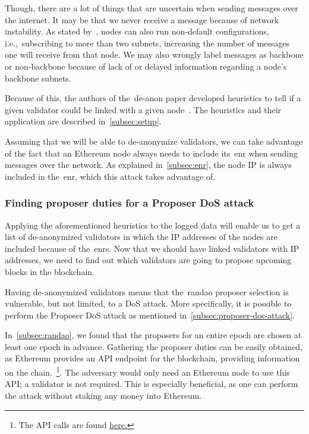 Though, there are a lot of things that are uncertain when sending messages over the internet.
It may be that we never receive a message because of network instability.
As stated by~\cite{heimbach2024deanonymizingethereumvalidatorsp2p}, nodes can also run non-default configurations,
i.e.,\ subscribing to more than two subnets, increasing the number of messages one will receive from that node.
We may also wrongly label messages as backbone or non-backbone because of lack of or delayed information regarding a node's backbone subnets.

Because of this,
the authors of the~\gls{de-anon paper} developed heuristics to tell if a given validator could be linked with a given node~\cite{heimbach2024deanonymizingethereumvalidatorsp2p}.
The heuristics and their application are described in~\autoref{subsec:setup}.

Assuming that we will be able to de-anonymize validators, we can take advantage of the fact that an Ethereum node always needs to include its~\gls{enr} when sending messages over the network.
As explained in~\autoref{subsec:enr}, the node IP is always included in the~\gls{enr}, which this attack takes advantage of.

\subsubsection{Finding proposer duties for a Proposer DoS attack}
Applying the aforementioned heuristics to the logged data will enable us to get a list of de-anonymized validators in which the IP addresses of the nodes are included because of the~\glspl{enr}.
Now that we should have linked validators with IP addresses, we need to find out which validators are going to propose upcoming blocks in the blockchain.

Having de-anonymized validators means that the~\gls{randao} proposer selection is vulnerable,
but not limited, to a DoS attack.
More specifically,
it is possible to perform the Proposer DoS attack as mentioned in~\autoref{subsec:proposer-dos-attack}.

In~\autoref{subsec:randao}, we found that the proposers for an entire epoch are chosen at least one epoch in advance.
Gathering the proposer duties can be easily obtained, as Ethereum provides an API endpoint for the blockchain,
providing information on the chain.~\footnote{The API calls are found \href{https://ethereum.github.io/beacon-APIs/\#/Validator/getProposerDuties}{here.}}.
The adversary would only need an Ethereum node to use this API; a validator is not required.
This is especially beneficial, as one can perform the attack without staking any money into Ethereum.

